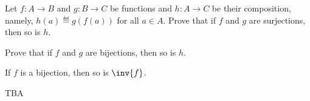 \begin{pcomments}
\end{pcomments}



\begin{problem}
  Let $f:A \to B$ and $g: B \to C$ be functions and $h:A \to C$ be their
  composition, namely, $h(a) \eqdef g(f(a))$ for all $a \in A$.
\bparts
  \ppart Prove that if $f$ and $g$ are surjections, then so is $h$.

  \ppart Prove that if $f$ and $g$ are bijections, then so is $h$.

  \ppart If $f$ is a bijection, then so is $\inv{f}$.

\eparts

\begin{solution}
TBA
\end{solution}

\end{problem}


\endinput
